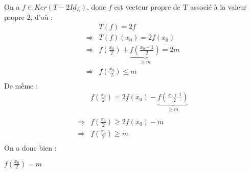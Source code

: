 On a $f\in Ker(T-2Id_E)$, donc $f$ est vecteur propre de T associé à la valeur propre $2$, d'où :
\[
  \begin{array}{rl}
                & T(f) = 2f                                                                                 \\
    \Rightarrow & T(f)(x_0) = 2f(x_0)                                                                       \\
    \Rightarrow & f\left(\frac{x_0}{2}\right) + \underbrace{f\left(\frac{x_0 + 1}{2}\right)}_{\geq m}  = 2m \\
    \Rightarrow & f\left(\frac{x_0}{2}\right) \leq m                                                        \\
  \end{array}
\]
De même :
\[
  \begin{array}{rl}
                & f\left(\frac{x_0}{2}\right) = 2f(x_0) - \underbrace{f\left(\frac{x_0 + 1}{2}\right)}_{\geq m} \\\\
    \Rightarrow & f\left(\frac{x_0}{2}\right) \geq 2f(x_0) - m                                                  \\
    \Rightarrow & f\left(\frac{x_0}{2}\right) \geq m                                                            \\
  \end{array}
\]
On a donc bien :
\begin{result}
  $f\left(\frac{x_0}{2}\right)  = m  $
\end{result}
